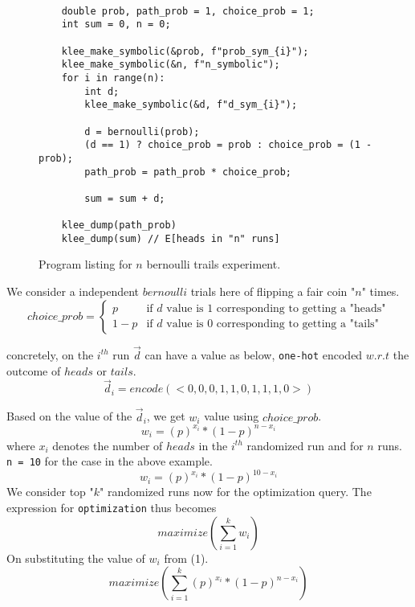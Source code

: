 \documentclass[usenames,dvipsnames,acmsmall]{acmart}
\begin{document}
	\begin{figure}
		\begin{verbatim}
	
	double prob, path_prob = 1, choice_prob = 1;
	int sum = 0, n = 0;
	
	klee_make_symbolic(&prob, f"prob_sym_{i}");
	klee_make_symbolic(&n, f"n_symbolic");
	for i in range(n):
		int d;
		klee_make_symbolic(&d, f"d_sym_{i}");
	
		d = bernoulli(prob);
		(d == 1) ? choice_prob = prob : choice_prob = (1 - prob);
		path_prob = path_prob * choice_prob;
		
		sum = sum + d;
		
	klee_dump(path_prob)
	klee_dump(sum) // E[heads in "n" runs] 
		\end{verbatim}
		\caption{Program listing for $n$ bernoulli trails experiment.}
	\end{figure}

We consider a independent $bernoulli$ trials here of flipping a fair coin "$n$" times. 
\[ 
{choice\_prob} = 
\begin{cases} 
	p & \textrm{if $d$ value is 1 corresponding to getting a "heads"} \\
	1-p & \textrm{if $d$ value is 0 corresponding to getting a "tails"}
\end{cases}
\]

concretely, on the $i^{th}$ run \texttt{$\vec{d}$} can have a value as below, \texttt{one-hot} encoded $w.r.t$ the outcome of $heads$ or $tails$.
\[
\vec{d}_{i} = encode(<0,0,0,1,1,0,1,1,1,0>)
\]

Based on the value of the $\vec{d}_{i}$, we get $w_{i}$ value using $choice\_prob$. 
\begin{equation}
	w_{i} = {(p)^{x_i} * (1-p)^{n-x_i}}
\end{equation}
where $x_i$ denotes the number of $heads$ in the $i^{th}$ randomized run and for $n$ runs. \texttt{n = 10} for the case in the above example. \\
\begin{equation}
	w_{i} = {(p)^{x_i} * (1-p)^{10-x_i}}
\end{equation}
We consider top "$k$" randomized runs now for the optimization query. The expression for \texttt{optimization} thus becomes 
\[	
	maximize(\sum_{i=1}^{k}{w_i})
\]
On substituting the value of $w_i$ from (1).
\begin{equation}	
	maximize(\sum_{i=1}^{k}{(p)^{x_i} * (1-p)^{n-x_i}})
\end{equation}
\end{document}
